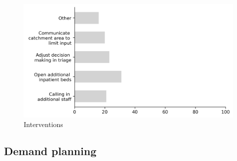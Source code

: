 \documentclass{article}
\begin{document}
\begin{figure}[H]
    \centering
        \includegraphics[width=1.0\textwidth]{../output/plots/interventions}
        \caption{Interventions}
        \label{fig:interventions}
\end{figure}

\subsection{Demand planning}
\end{document}
